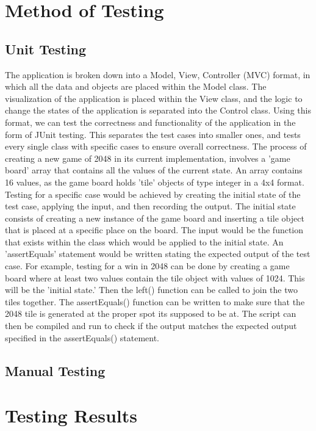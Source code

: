\documentclass[12pt]{article}
\begin{document}
\section {Method of Testing}

\subsection {Unit Testing}
The application is broken down into a Model, View, Controller (MVC) format, in which all the data and objects are placed within the Model class. The visualization of the application is placed within the View class, and the logic to change the states of the application is separated into the Control class. Using this format, we can test the correctness and functionality of the application in the form of JUnit testing. This separates the test cases into smaller ones, and tests every single class with specific cases to ensure overall correctness. The process of creating a new game of 2048 in its current implementation, involves a 'game board' array that contains all the values of the current state. An array contains 16 values, as the game board holds 'tile' objects of type integer in a 4x4 format. Testing for a specific case would be achieved by creating the initial state of the test case, applying the input, and then recording the output. The initial state consists of creating a new instance of the game board and inserting a tile object that is placed at a specific place on the board. The input would be the function that exists within the class which would be applied to the initial state.  An 'assertEquals' statement would be written stating the expected output of the test case.  For example, testing for a win in 2048 can be done by creating a game board where at least two values contain the tile object with values of 1024. This will be the 'initial state.' Then the left() function can be called to join the two tiles together. The assertEquals() function can be written to make sure that the 2048 tile is generated at the proper spot its supposed to be at. The script can then be compiled and run to check if the output matches the expected output specified in the assertEquals() statement.

\subsection{Manual Testing}



\section{Testing Results}
\end{document}
